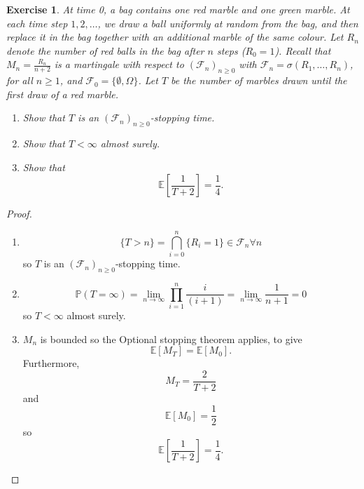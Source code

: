 \documentclass{article}
\newtheorem{exercise}[theorem]{Exercise}
\begin{document}
\begin{exercise}
At time 0, a bag contains one red marble and one green marble. At each time step $1, 2, \dots$, we draw a ball uniformly at random from the bag, and then replace it in the bag together with an additional marble of the same colour. Let $R_n$ denote the number of red balls in the bag after $n$ steps ($R_0 = 1$). Recall that $M_n = \frac{R_n}{n+2}$ is a martingale with respect to $(\mathcal{F}_n)_{n \geq 0}$ with $\mathcal{F}_n = \sigma(R_1, \dots, R_n)$, for all $n \geq 1$, and $\mathcal{F}_0 = \{\emptyset, \Omega\}$. Let $T$ be the number of marbles drawn until the first draw of a red marble.

\begin{enumerate}
    \item[(i)] Show that $T$ is an $(\mathcal{F}_n)_{n \geq 0}$-stopping time.
    
    \item[(ii)] Show that $T < \infty$ almost surely.
    
    \item[(iii)] Show that
    \[
    \mathbb{E} \left[ \frac{1}{T + 2} \right] = \frac{1}{4}.
    \]
\end{enumerate}
\end{exercise}
\begin{proof}
\begin{enumerate}
\item[(i)] \[\{T>n\}=\bigcap_{i=0}^n\{R_i=1\}\in\mathcal{F}_n\forall n\] so $T$ is an $(\mathcal{F}_n)_{n \geq 0}$-stopping time.
\item[(ii)] \[\mathbb{P}(T=\infty)=\lim_{n\to\infty}\prod_{i=1}^n\frac{i}{(i+1)}=\lim_{n\to\infty}\frac{1}{n+1}=0\] so $T<\infty$ almost surely.
\item[(iii)] $M_n$ is bounded so the Optional stopping theorem applies, to give \[\mathbb{E}[M_T]=\mathbb{E}[M_0].\]Furthermore,\[M_T=\frac{2}{T+2}\] and\[\mathbb{E}[M_0]=\frac{1}{2}\] so\[\mathbb{E}\left[\frac{1}{T+2}\right]=\frac{1}{4}.\]
\end{enumerate}
\end{proof}
\end{document}

